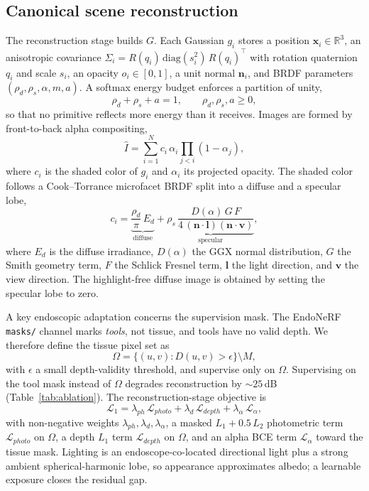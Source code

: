\documentclass[review]{elsarticle}
\begin{document}
\subsection{Canonical scene reconstruction}
\label{sec:tier1}
The reconstruction stage builds $G$. Each Gaussian $g_i$ stores a position
$\mathbf{x}_i \in \mathbb{R}^3$, an anisotropic covariance
$\Sigma_i = R(q_i)\,\mathrm{diag}(s_i^2)\,R(q_i)^{\top}$ with rotation
quaternion $q_i$ and scale $s_i$, an opacity $o_i \in [0,1]$, a unit normal
$\mathbf{n}_i$, and BRDF parameters $(\rho_d, \rho_s, \alpha, m, a)$. A
softmax energy budget enforces a partition of unity,
\begin{equation}
\rho_d + \rho_s + a = 1, \qquad \rho_d,\rho_s,a \ge 0,
\label{eq:budget}
\end{equation}
so that no primitive reflects more energy than it receives. Images are
formed by front-to-back alpha compositing,
\begin{equation}
\hat{I} = \sum_{i=1}^{N} c_i\,\alpha_i \prod_{j<i}(1-\alpha_j),
\label{eq:render}
\end{equation}
where $c_i$ is the shaded color of $g_i$ and $\alpha_i$ its projected
opacity. The shaded color follows a Cook--Torrance microfacet BRDF
\citep{cooktorrance} split into a diffuse and a specular lobe,
\begin{equation}
c_i = \underbrace{\frac{\rho_d}{\pi}\,E_d}_{\text{diffuse}}
+ \underbrace{\rho_s\,\frac{D(\alpha)\,G\,F}{4\,(\mathbf{n}\cdot\mathbf{l})(\mathbf{n}\cdot\mathbf{v})}}_{\text{specular}},
\label{eq:cooktorrance}
\end{equation}
where $E_d$ is the diffuse irradiance, $D(\alpha)$ the GGX normal
distribution, $G$ the Smith geometry term, $F$ the Schlick Fresnel term,
$\mathbf{l}$ the light direction, and $\mathbf{v}$ the view direction. The
highlight-free diffuse image is obtained by setting the specular lobe to
zero.

A key endoscopic adaptation concerns the supervision mask. The EndoNeRF
\texttt{masks/} channel marks \emph{tools}, not tissue, and tools have no
valid depth. We therefore define the tissue pixel set as
\begin{equation}
\Omega = \{(u,v) : D(u,v) > \epsilon \} \setminus M,
\label{eq:mask}
\end{equation}
with $\epsilon$ a small depth-validity threshold, and supervise only on
$\Omega$. Supervising on the tool mask instead of $\Omega$ degrades
reconstruction by ${\sim}25$\,dB (Table~\ref{tab:ablation}). The reconstruction-stage
objective is
\begin{equation}
\mathcal{L}_1 = \lambda_{ph}\,\mathcal{L}_{photo} + \lambda_d\,\mathcal{L}_{depth} + \lambda_\alpha\,\mathcal{L}_{\alpha},
\label{eq:tier1loss}
\end{equation}
with non-negative weights $\lambda_{ph},\lambda_d,\lambda_\alpha$, a masked
$L_1 + 0.5\,L_2$ photometric term $\mathcal{L}_{photo}$ on $\Omega$, a
depth $L_1$ term $\mathcal{L}_{depth}$ on $\Omega$, and an alpha BCE term
$\mathcal{L}_{\alpha}$ toward the tissue mask. Lighting is an
endoscope-co-located directional light plus a strong ambient
spherical-harmonic lobe, so appearance approximates albedo; a learnable
exposure closes the residual gap.
\end{document}
